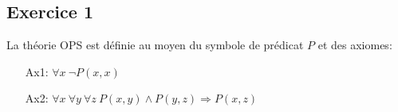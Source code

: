 \section{}



% 
% 

\subsection*{Exercice 1}
La th\'{e}orie OPS est d\'{e}finie au moyen du symbole de pr\'{e}dicat $P$ et des axiomes:
\begin{enumerate}
\item[Ax1:] $\forall x \ \neg P(x, x)$
\item[Ax2:] $\forall x \ \forall y \ \forall z \ P(x, y) \wedge P(y, z) \Rightarrow P(x, z)$
\end{enumerate}

